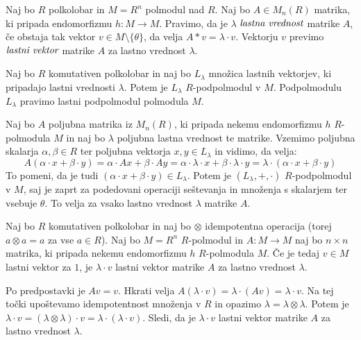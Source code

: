 \documentclass[mat1]{fmfdelo}
\newcommand{\pojem}[1]{\ensuremath{\emph{#1}}}
\newcommand{\map}[3]{\ensuremath{{#1}:{#2}\rightarrow{#3}}}
\begin{document}
\begin{definicija}
	Naj bo $R$ polkolobar in $M = R^n$ polmodul nad $R$. Naj bo $A\in M_n(R)$ matrika, ki pripada endomorfizmu $\map{h}{M}{M}$. Pravimo, da je $\lambda$ \pojem{lastna vrednost} matrike $A$, če obstaja tak vektor $v\in M\setminus\{\theta\}$, da velja $A * v = \lambda \cdot v$. Vektorju $v$ previmo \pojem{lastni vektor} matrike $A$ za lastno vrednost $\lambda$.
\end{definicija}


\begin{trditev}
Naj bo $R$ komutativen polkolobar in naj bo $L_\lambda$ množica lastnih vektorjev, ki pripadajo lastni vrednosti $\lambda$. Potem je $L_\lambda$ $R$-podpolmodul v $M$. Podpolmodulu $L_\lambda$ pravimo lastni podpolmodul polmodula $M$.
\end{trditev}

\begin{dokaz}
Naj bo $A$ poljubna matrika iz $M_n(R)$, ki pripada nekemu endomorfizmu $h$ $R$-polmodula $M$ in naj bo $\lambda$ poljubna lastna vrednost te matrike. Vzemimo poljubna skalarja $\alpha, \beta\in R$ ter poljubna vektorja $x, y \in L_\lambda$ in vidimo, da velja: $$A(\alpha\cdot x + \beta\cdot y) = \alpha\cdot Ax + \beta\cdot Ay = \alpha\cdot\lambda\cdot x + \beta\cdot\lambda\cdot y = \lambda\cdot (\alpha\cdot x + \beta\cdot y)$$ To pomeni, da je tudi $(\alpha\cdot x + \beta\cdot y)\in L_\lambda$. Potem je $(L_\lambda, +, \cdot)$ $R$-podpolmodul v $M$, saj je zaprt za podedovani operaciji seštevanja in množenja s skalarjem ter vsebuje $\theta$. To velja za vsako lastno vrednost $\lambda$ matrike $A$.
\end{dokaz}

\begin{trditev}
Naj bo $R$ komutativen polkolobar in naj bo $\otimes$ idempotentna operacija (torej $a\otimes a = a$ za vse  $a\in R$). Naj bo $M=R^n$ $R$-polmodul in $\map{A}{M}{M}$ naj bo $n\times n$ matrika, ki pripada nekemu endomorfizmu $h$ $R$-polmodula $M$. Če je tedaj $v\in M$ lastni vektor za $1$, je $\lambda\cdot v$ lastni vektor matrike $A$ za lastno vrednost $\lambda$.
\end{trditev}
\begin{dokaz}
	Po predpostavki je $Av = v$. Hkrati velja $A(\lambda\cdot v) = \lambda\cdot (Av) = \lambda\cdot v$. Na tej točki upoštevamo idempotentnost množenja v $R$ in opazimo $\lambda = \lambda\otimes\lambda$. Potem je $\lambda\cdot v = (\lambda\otimes\lambda)\cdot v = \lambda \cdot (\lambda\cdot v)$. Sledi, da je $\lambda\cdot v$ lastni vektor matrike $A$ za lastno vrednost $\lambda$.
\end{dokaz}
\end{document}
